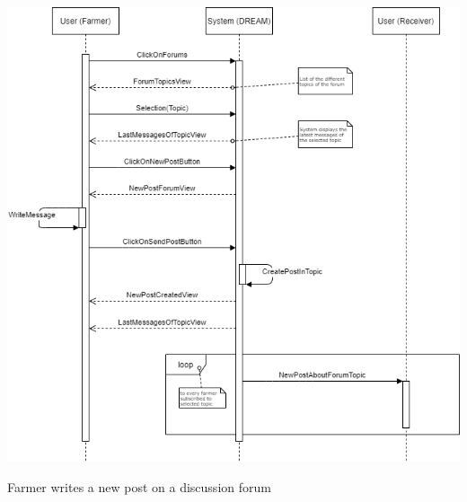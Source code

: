 \documentclass{article}
\begin{document}
\begin{center}
    \includegraphics[width=1.0\textwidth]{images/sequenceDiagrams/8. FarmerNewPostDiscForum.png}
    \par
    \caption{\label{fig:frog}Farmer writes a new post on a discussion forum}

    \newpage
    
    
    
    
    
    
    

\end{center}
\end{document}
